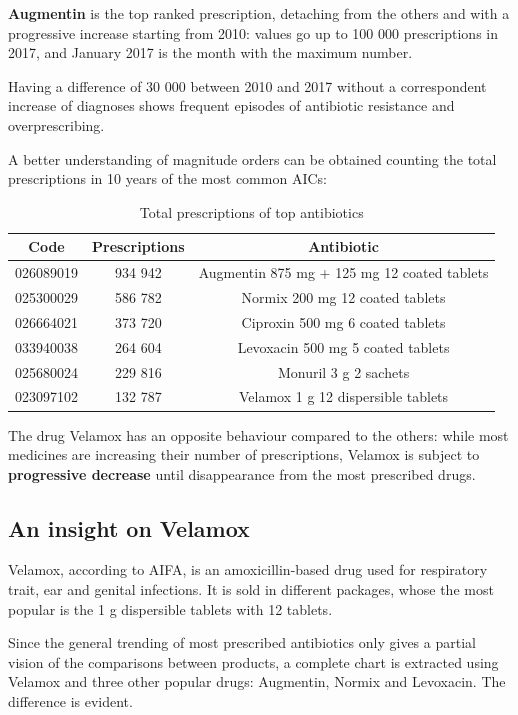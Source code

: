\textbf{Augmentin} is the top ranked prescription, detaching from the others and with a progressive increase starting from 2010: values go up to 100 000 prescriptions in 2017, and January 2017 is the month with the maximum number.

Having a difference of 30 000 between 2010 and 2017 without a correspondent increase of diagnoses shows frequent episodes of antibiotic resistance and overprescribing.

A better understanding of magnitude orders can be obtained counting the total prescriptions in 10 years of the most common AICs:

\begin{table}[h]
	\centering
	\begin{tabular}{c|c|c}
		\textbf{Code} & \textbf{Prescriptions} & \textbf{Antibiotic} \\
		\hline
		026089019 & 934 942 & Augmentin 875 mg + 125 mg 12 coated tablets \\
		\hline
		025300029 & 586 782 & Normix 200 mg 12 coated tablets\\
		\hline
		026664021 & 373 720 & Ciproxin 500 mg 6 coated tablets \\
		\hline
		033940038 & 264 604 & Levoxacin 500 mg 5 coated tablets \\
		\hline
		025680024 & 229 816 & Monuril 3 g 2 sachets \\
		\hline
		023097102 & 132 787 & Velamox 1 g 12 dispersible tablets \\
	\end{tabular}
	\caption{\small Total prescriptions of top antibiotics}
\end{table}

The drug Velamox has an opposite behaviour compared to the others: while most medicines are increasing their number of prescriptions, Velamox is subject to \textbf{progressive decrease} until disappearance from the most prescribed drugs.

\subsection{An insight on Velamox}
Velamox, according to AIFA, is an amoxicillin-based drug used for respiratory trait, ear and genital infections. It is sold in different packages, whose the most popular is the 1 g dispersible tablets with 12 tablets.

Since the general trending of most prescribed antibiotics only gives a partial vision of the comparisons between products, a complete chart is extracted using Velamox and three other popular drugs: Augmentin, Normix and Levoxacin. The difference is evident.


